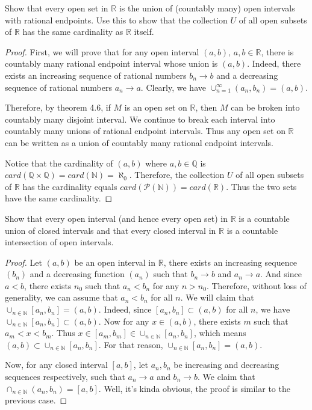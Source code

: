 \documentclass[12pt, a4paper]{article}
\theoremstyle{plain}
\newcommand{\N}{\mathbb{N}}
\newcommand{\Q}{\mathbb{Q}}
\newcommand{\R}{\mathbb{R}}
\begin{document}
\begin{exercise}{7}
Show that every open set in $\R$ is the union of (countably many) open intervals with rational endpoints. Use this to show that the collection $U$ of all open subsets of $\R$ has the same cardinality as $\R$ itself.
\end{exercise}
	\begin{proof}
	First, we will prove that for any open interval $(a,b),\, a,b\in\R$, there is countably many rational endpoint interval whose union is $(a,b)$. Indeed, there exists an increasing sequence of rational numbers $b_n\rightarrow b$ and a decreasing sequence of rational numbers $a_n\rightarrow a$. Clearly, we have $\cup_{n=1}^\infty (a_n,b_n)=(a,b)$. 
	
	Therefore, by theorem 4.6, if $M$ is an open set on $\R$, then $M$ can be broken into countably many disjoint interval. We continue to break each interval into countably many unions of rational endpoint intervals. Thus any open set on $\R$ can be written as a union of countably many rational endpoint intervals.
	
	Notice that the cardinality of $(a,b)$ where $a,b\in \Q$ is $card(\Q\times\Q )=card(\N)=\aleph_0$. Therefore, the collection $U$ of all open subsets of $\R$ has the cardinality equals $card(\mathcal{P}(\N))=card(\R)$. Thus the two sets have the same cardinality.
	\end{proof}

\begin{exercise}{8}
Show that every open interval (and hence every open set) in $\R$ is a countable union of closed intervals and that every closed interval in $\R$ is a countable intersection of open intervals.
\end{exercise}
	\begin{proof}
	Let $(a,b)$ be an open interval in $\R$, there exists an increasing sequence $(b_n)$ and a decreasing function $(a_n)$ such that $b_n\rightarrow b$ and $a_n\rightarrow a$. And since $a<b$, there exists $n_0$ such that $a_n<b_n$ for any $n>n_0$. Therefore, without loss of generality, we can assume that $a_n<b_n$ for all $n$. We will claim that $\cup_{n\in\N}[a_n,b_n]=(a,b)$. Indeed, since $[a_n,b_n]\subset (a,b)$ for all $n$, we have $\cup_{n\in\N}[a_n,b_n]\subset (a,b)$. Now for any $x\in (a,b)$, there exists $m$ such that $a_m<x<b_m$. Thus  $x\in [a_m,b_m]\in \cup_{n\in\N} [a_n,b_n]$, which means $(a,b)\subset \cup_{n\in\N}[a_n,b_n]$. For that reason, $\cup_{n\in\N}[a_n,b_n]=(a,b)$.
	
	Now, for any closed interval $[a,b]$, let $a_n,b_n$ be increasing and decreasing sequences respectively, such that $a_n\rightarrow a$ and $b_n\rightarrow b$. We claim that $\cap_{n\in \N}(a_n,b_n)=[a,b]$. Well, it's kinda obvious, the proof is similar to the previous case.
	\end{proof}
\end{document}

